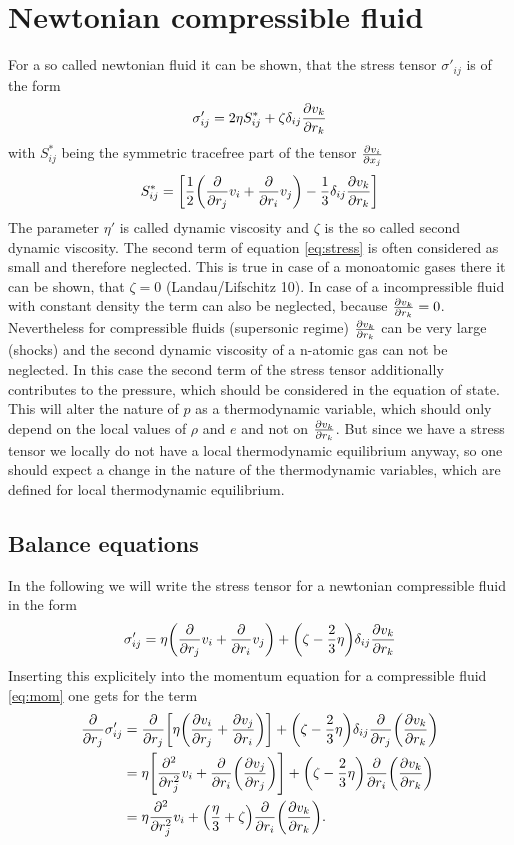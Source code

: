 \section{Newtonian compressible fluid}
For a so called newtonian fluid it can be shown, that the stress tensor
$\sigma'_{ij}$ is of the form
\begin{align}
\sigma'_{ij}=2\eta S^*_{ij}+\zeta \delta_{ij}\ppd{r_k}{v_k}
\label{eq:stress}
\end{align}
with $S^*_{ij}$ being the symmetric tracefree part of the tensor
$\ppd{x_j}{v_i}$
\begin{align}
S^*_{ij}=\lrb{\frac{1}{2}\lra{\pd{r_j}v_i+\pd{r_i}v_j}-\frac{1}{3}\delta_{ij}
\ppd{r_k}{v_k}}
\end{align}
The parameter $\eta'$ is called dynamic viscosity and $\zeta$ is the so called
second dynamic viscosity. The second term of equation \eqref{eq:stress} is
often considered as small and therefore neglected. This is true in case of a
monoatomic gases there it can be shown, that $\zeta=0$ (Landau/Lifschitz 10).
In case of a incompressible fluid with constant density the term can also be
neglected, because $\ppd{r_k}{v_k} = 0$. Nevertheless for compressible fluids
(supersonic regime) $\ppd{r_k}{v_k}$ can be very large (shocks) and the second
dynamic viscosity of a n-atomic gas can not be neglected. In this case the
second term of the stress tensor additionally contributes to the pressure,
which should be considered in the equation of state. This will alter the nature
of $p$ as a thermodynamic variable, which should only depend on the local values
of $\rho$ and $e$ and not on $\ppd{r_k}{v_k}$. But since we have a stress tensor
we locally do not have a local thermodynamic equilibrium anyway, so one should
expect a change in the nature of the thermodynamic variables, which are
defined for local thermodynamic equilibrium.

\subsection{Balance equations}
In the following we will write the stress tensor for a newtonian compressible 
fluid in the form
\begin{align}
\sigma'_{ij}= \eta\lra{\pd{r_j}v_i+\pd{r_i}v_j} 
+ \lra{\zeta-\frac{2}{3}\eta}\delta_{ij}\ppd{r_k}{v_k} 
\label{eq:stress2}
\end{align}
Inserting this explicitely into the momentum equation for a compressible fluid
\eqref{eq:mom} one gets for the term
\begin{align}
\begin{split}
\pd{r_j} \sigma'_{ij} &= 
\pd{r_j}\lrb{\eta \lra{\ppd{r_j}{v_i}+\ppd{r_i}{v_j}}}
+\lra{\zeta-\frac{2}{3}\eta}\delta_{ij}\pd{r_j}\lra{\ppd{r_k}{v_k}}\\
&= \eta \lrb{\pdd{r_j}v_i +\pd{r_i}\lra{\ppd{r_j}{v_j}}}
+\lra{\zeta-\frac{2}{3}\eta}\pd{r_i}\lra{\ppd{r_k}{v_k}}\\
&=\eta \pdd{r_j}v_i
+\lra{\frac{\eta}{3}+\zeta}\pd{r_i}\lra{\ppd{r_k}{v_k}}.
\end{split}
\label{eq:divstress}
\end{align}

